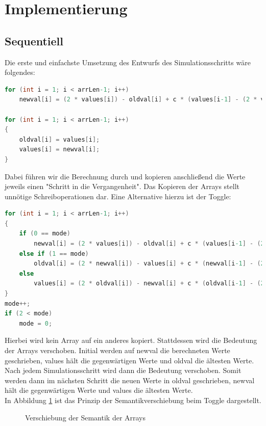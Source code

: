 
\section{Implementierung}
\subsection{Sequentiell}
Die erste und einfachste Umsetzung des Entwurfs des Simulationsschritts wäre folgendes:
\begin{lstlisting}[language=C]
for (int i = 1; i < arrLen-1; i++)
	newval[i] = (2 * values[i]) - oldval[i] + c * (values[i-1] - (2 * values[i]) + values[i+1]);

for (int i = 1; i < arrLen-1; i++) 
{
	oldval[i] = values[i];
	values[i] = newval[i];
}
\end{lstlisting}

Dabei führen wir die Berechnung durch und kopieren anschließend die Werte jeweils einen "Schritt in die Vergangenheit". Das Kopieren der Arrays stellt unnötige Schreiboperationen dar. Eine Alternative hierzu ist der Toggle:

\begin{lstlisting}[language=C]
for (int i = 1; i < arrLen-1; i++)
{
	if (0 == mode)
		newval[i] = (2 * values[i]) - oldval[i] + c * (values[i-1] - (2 * values[i]) + values[i+1]);
	else if (1 == mode)
		oldval[i] = (2 * newval[i]) - values[i] + c * (newval[i-1] - (2 * newval[i]) + newval[i+1]);
	else
		values[i] = (2 * oldval[i]) - newval[i] + c * (oldval[i-1] - (2 * oldval[i]) + oldval[i+1]);
}
mode++;
if (2 < mode)
	mode = 0;
\end{lstlisting}

Hierbei wird kein Array auf ein anderes kopiert. Stattdessen wird die Bedeutung der Arrays verschoben. Initial werden auf newval die berechneten Werte geschrieben, values hält die gegenwärtigen Werte und oldval die ältesten Werte. Nach jedem Simulationsschritt wird dann die Bedeutung verschoben. Somit werden dann im nächsten Schritt die neuen Werte in oldval geschrieben, newval hält die gegenwärtigen Werte und values die ältesten Werte.\\
In Abbildung \ref{fig:toggle_swap} ist das Prinzip der Semantikverschiebung beim Toggle dargestellt.\\

\begin{figure}[H]
	\centering
	\caption{Verschiebung der Semantik der Arrays}
	\label{fig:toggle_swap}
\end{figure}

